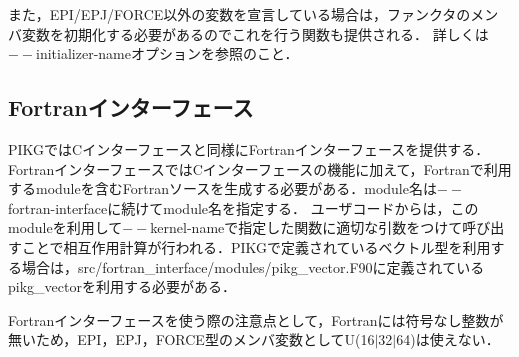\documentclass{article}
\begin{document}
また，EPI/EPJ/FORCE以外の変数を宣言している場合は，ファンクタのメンバ変数を初期化する必要があるのでこれを行う関数も提供される．
詳しくは$--$initializer-nameオプションを参照のこと．

\subsection{Fortranインターフェース}
PIKGではCインターフェースと同様にFortranインターフェースを提供する．
FortranインターフェースではCインターフェースの機能に加えて，Fortranで利用するmoduleを含むFortranソースを生成する必要がある．module名は$--$fortran-interfaceに続けてmodule名を指定する．
ユーザコードからは，このmoduleを利用して$--$kernel-nameで指定した関数に適切な引数をつけて呼び出すことで相互作用計算が行われる．PIKGで定義されているベクトル型を利用する場合は，src/fortran\_interface/modules/pikg\_vector.F90に定義されているpikg\_vectorを利用する必要がある．

Fortranインターフェースを使う際の注意点として，Fortranには符号なし整数が無いため，EPI，EPJ，FORCE型のメンバ変数としてU(16$|$32$|$64)は使えない．
\end{document}
